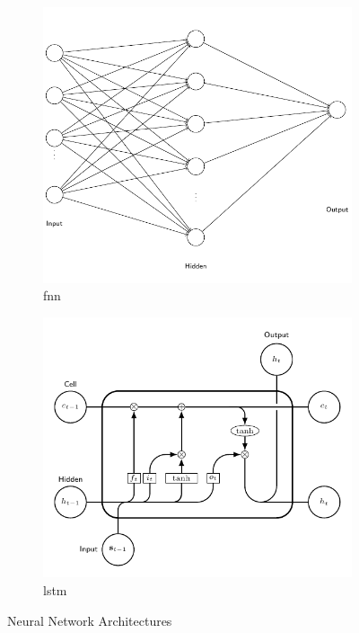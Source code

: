 \begin{figure}[ht!]
    \centering
    \begin{subfigure}{0.45\textwidth}
        \includegraphics[width=\textwidth]{./project3/tikz/fnn.pdf}
        \caption{\gls{fnn}}
        \label{subfig:fnn}
    \end{subfigure}
    \hspace{1cm}
    \begin{subfigure}{0.45\textwidth}
        \includegraphics[width=\textwidth]{./project3/tikz/lstm.pdf}
        \caption{\gls{lstm}}
        \label{subfig:lstm}
    \end{subfigure}
    \caption{Neural Network Architectures}
    \label{fig:nn}
\end{figure}

